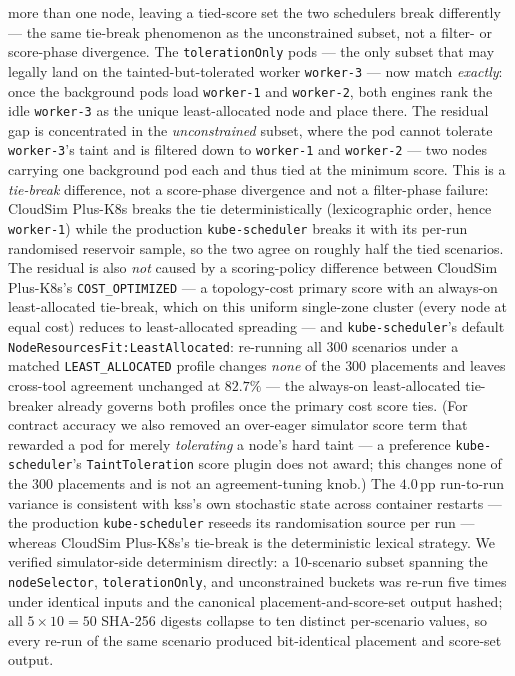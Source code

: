\documentclass[ASNA,twocolumn]{USG}
\newcommand{\ckm}{CloudSim Plus-K8s\xspace}
\begin{document}
    more than one node, leaving a tied-score set the two schedulers break
    differently --- the same tie-break phenomenon as the unconstrained
    subset, not a filter- or score-phase divergence.
    The \texttt{tolerationOnly} pods --- the only subset that may legally
    land on the tainted-but-tolerated worker \texttt{worker-3} --- now match
    \emph{exactly}: once the background pods load \texttt{worker-1} and
    \texttt{worker-2}, both engines rank the idle \texttt{worker-3} as the
    unique least-allocated node and place there. The residual gap is
    concentrated in the \emph{unconstrained} subset, where the pod cannot
    tolerate \texttt{worker-3}'s taint and is filtered down to
    \texttt{worker-1} and \texttt{worker-2} --- two nodes carrying one
    background pod each and thus tied at the minimum score. This is a
    \emph{tie-break} difference, not a score-phase divergence and not a
    filter-phase failure: \ckm breaks the tie deterministically
    (lexicographic order, hence \texttt{worker-1}) while the production
    \texttt{kube-scheduler} breaks it with its per-run randomised
    reservoir sample, so the two agree on roughly half the tied scenarios.
    The residual is also \emph{not} caused by a scoring-policy
    difference between \ckm's \texttt{COST\_OPTIMIZED} --- a topology-cost
    primary score with an always-on least-allocated tie-break, which on
    this uniform single-zone cluster (every node at equal cost) reduces to
    least-allocated spreading --- and \texttt{kube-scheduler}'s default
    \texttt{NodeResourcesFit:LeastAllocated}:
    re-running all $300$ scenarios under a matched \texttt{LEAST\_ALLOCATED}
    profile changes \emph{none} of the $300$ placements and leaves
    cross-tool agreement unchanged at $82.7\%$ --- the always-on
    least-allocated tie-breaker already governs both profiles once the
    primary cost score ties. (For contract accuracy we also removed an
    over-eager simulator score term that rewarded a pod for merely
    \emph{tolerating} a node's hard taint --- a preference
    \texttt{kube-scheduler}'s \texttt{TaintToleration} score plugin does
    not award; this changes none of the $300$ placements and is not an
    agreement-tuning knob.)
    The $4.0\,$pp run-to-run variance is consistent with kss's own
    stochastic state across container restarts --- the production
    \texttt{kube-scheduler} reseeds its randomisation source per run ---
    whereas \ckm's tie-break is the deterministic lexical strategy. We
    verified simulator-side determinism directly: a 10-scenario subset
    spanning the \texttt{nodeSelector}, \texttt{tolerationOnly}, and
    unconstrained buckets was re-run five times under identical inputs
    and the canonical placement-and-score-set output hashed; all
    $5 \times 10 = 50$ SHA-256 digests collapse to ten distinct
    per-scenario values, so every re-run of the same scenario
    produced bit-identical placement and score-set output.
\end{document}
